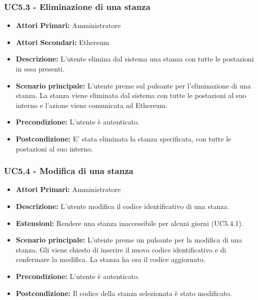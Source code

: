 \subsubsection{ UC5.3 - Eliminazione di una stanza}
\begin{itemize}
	\item\textbf{Attori Primari:}
	Amministratore 
	\item\textbf{Attori Secondari:}
	Ethereum
	\item\textbf{Descrizione:} 
	L'utente elimina dal sistema una stanza con tutte le postazioni in essa presenti.
	\item\textbf{Scenario principale:} 
	L'utente preme sul pulsante per l'eliminazione di una stanza. La stanza viene eliminata dal sistema con tutte le postazioni al suo interno e l'azione viene comunicata ad Ethereum.
	\item\textbf{Precondizione:} 
	L'utente è autenticato.
	\item\textbf{Postcondizione:}
	E' stata eliminata la stanza specificata, con tutte le postazioni al suo interno.
\end{itemize}

\subsubsection{ UC5.4 - Modifica di una stanza}
\begin{itemize}
	\item\textbf{Attori Primari:}
	Amministratore 
	\item\textbf{Descrizione:}
	L'utente modifica il codice identificativo di una stanza.
	\item\textbf{Estensioni:}
	Rendere una stanza inaccessibile per alcuni giorni (UC5.4.1).
	\item\textbf{Scenario principale:} 
	L'utente preme un pulsante per la modifica di una stanza. Gli viene chiesto di inserire il nuovo codice identificativo e di confermare la modifica. La stanza ha ora il codice aggiornato.
	\item\textbf{Precondizione:} 
	L'utente è autenticato.
	\item\textbf{Postcondizione:}
	Il codice della stanza selezionata è stato modificato.
\end{itemize}

